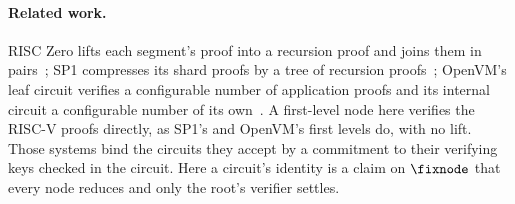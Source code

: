 \paragraph{Related work.} RISC Zero lifts each segment's proof into a recursion proof and joins them in pairs~\cite{BG23}; SP1 compresses its shard proofs by a tree of recursion proofs~\cite{SP1}; OpenVM's leaf circuit verifies a configurable number of application proofs and its internal circuit a configurable number of its own~\cite{OpenVM}. A first-level node here verifies the RISC-V proofs directly, as SP1's and OpenVM's first levels do, with no lift. Those systems bind the circuits they accept by a commitment to their verifying keys checked in the circuit. Here a circuit's identity is a claim on $\fixnode$ that every node reduces and only the root's verifier settles.
